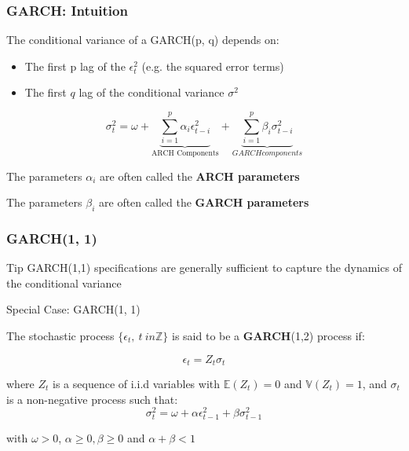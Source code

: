 \documentclass{beamer}
\newenvironment{wideitemize}{\itemize\addtolength{\itemsep}{10pt}}{\enditemize}
\begin{document}
\begin{frame}
  \frametitle{GARCH: Intuition}


  \begin{wideitemize}
  \item The conditional variance of a GARCH(p, q) depends on:
    \begin{itemize}
    \item The first p lag of the $\epsilon_t^2$ (e.g. the squared error terms)
    \item The first $q$ lag of the conditional variance $\sigma^2$
    \end{itemize}

 \begin{equation*}
    \sigma^2_t = \omega + \underbrace{\sum^p_{i=1} \alpha_i \epsilon^2_{t-i}}_{\text{ARCH Components}} + \underbrace{\sum^p_{i=1} \beta_i \sigma^2_{t-i}}_{GARCH components}
  \end{equation*}
    
   
  \item The parameters $\alpha_i$ are often called the \textbf{ARCH parameters}
  \item The parameters $\beta_i$ are often called the \textbf{GARCH parameters}
\end{wideitemize}
  
\end{frame}

\begin{frame}
  \frametitle{GARCH(1, 1)}

  \begin{alertblock}{Tip}
GARCH(1,1) specifications are generally sufficient to capture the dynamics of the conditional variance
  \end{alertblock}

  \medskip
  
\begin{block}{Special Case: GARCH(1, 1)}

  The stochastic process $\{ \epsilon_t, \ t \ in \mathbb{Z} \}$ is said to be a \textbf{GARCH}(1,2) process if:

  \begin{equation*}
    \epsilon_t = Z_t \sigma_t
  \end{equation*}

  \medskip

  where $Z_t$ is a sequence of i.i.d variables with $\mathbb{E}(Z_t) = 0$ and $\mathbb{V}(Z_t) = 1$, and $\sigma_t$ is a non-negative process such that:
  \begin{equation*}
    \sigma^2_t = \omega + \alpha \epsilon^2_{t-1} + \beta \sigma^2_{t-1}
  \end{equation*}

  \medskip

  with $\omega >0$, $\alpha \geq 0, \beta \geq 0$ and $\alpha + \beta <1$  
\end{block}
\end{frame}
\end{document}
